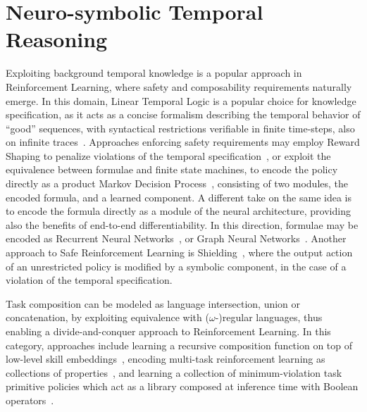 \section{Neuro-symbolic Temporal Reasoning}
Exploiting background temporal knowledge is a popular approach in Reinforcement Learning, where safety and composability requirements naturally emerge. In this domain, Linear Temporal Logic is a popular choice for knowledge specification, as it acts as a concise formalism describing the temporal behavior of ``good'' sequences, with syntactical restrictions verifiable in finite time-steps, also on infinite traces~\cite{lacerda2015optimal}.
%
Approaches enforcing safety requirements may employ Reward Shaping to penalize violations of the temporal specification~\cite{camacho2017non,umili2024neural,bagatella2024directed,camacho2019ltl,jiang2021temporal}, or exploit the equivalence between \LTL formulae and finite state machines, to encode the policy directly as a product Markov Decision Process~\cite{fu2014probably,wen2015correct}, consisting of two modules, the encoded formula, and a learned component. A different take on the same idea is to encode the \LTL formula directly as a module of the neural architecture, providing also the benefits of end-to-end differentiability. In this direction, \LTL formulae may be encoded as Recurrent Neural  Networks~\cite{kuo2020encoding}, or  Graph Neural Networks~\cite{vaezipoor2021ltl2action}.
Another approach to Safe Reinforcement Learning is Shielding~\cite{alshiekh2018safe}, where the output action of an unrestricted policy is modified by a symbolic component, in the case of a violation of the temporal specification.

Task composition can be modeled as language intersection, union or concatenation, by exploiting \LTL equivalence with ($\omega$-)regular languages, thus enabling a divide-and-conquer approach to Reinforcement Learning. In this category, approaches include learning a recursive composition function on top of low-level skill embeddings~\cite{sahni2017learning}, encoding multi-task reinforcement learning as collections of \LTL properties~\cite{toro2018teaching}, and learning a collection of minimum-violation task primitive policies which act as a library composed at inference time with Boolean operators~\cite{bergeron2024temporal}.


